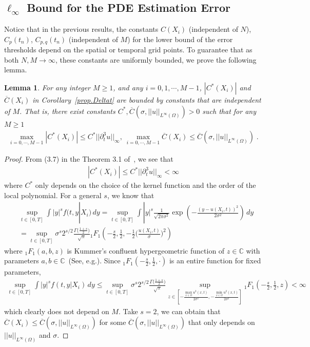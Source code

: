 \documentclass[a4paper,11pt]{article}
\newtheorem{lemma}{Lemma}[section]
\begin{document}
\subsection{$\ell_\infty$ Bound for the PDE Estimation Error}
Notice that in the previous results, the constants $C(X_i)$ (independent of $N$), $C_p(t_n)$, $C_{p,q}(t_n)$ (independent of $M$) for the lower bound of the error thresholds depend on the spatial or temporal grid points. To guarantee that as both $N,M\to\infty$, these constants are uniformly bounded, we prove the following lemma.
\begin{lemma}\label{lemma}
For any integer $M\geq 1$, and any $i=0,1,\cdots, M-1$,  $|C^*(X_i)|$ and $\overline{C}(X_i)$ in Corollary~\ref{prop.Deltat} are bounded by constants that are independent of $M$. That is, there exist constants $C^*, \overline{C}(\sigma,||u||_{L^\infty(\Omega)})>0$ such that for any $M\geq 1$
\begin{align}
\max_{i=0,\cdots, M-1}|C^*(X_i)|\leq C^*||\partial_t^3u||_\infty,~\max_{i=0,\cdots, M-1}\overline{C}(X_i)\leq \overline{C}(\sigma,||u||_{L^\infty(\Omega)})\;.
\end{align}
\end{lemma}
\begin{proof}
From (3.7) in the Theorem 3.1 of~\cite{fan1997local}, we see that
\begin{align*}
|C^*(X_i)|\leq C^*||\partial_t^3u||_\infty<\infty
\end{align*}
where $C^*$ only depends on the choice of the kernel function and the order of the local polynomial. For a general $s$, we know that
\begin{align*}
&\sup_{t\in [0,T]}\int |y|^sf(t,y|X_i)\,dy=\sup_{t\in [0,T]}\int |y|^s\frac{1}{\sqrt{2\pi\sigma^2}}\exp(-\frac{(y-u(X_i,t))^2}{2\sigma^2})\,dy\\
&=\sup_{t\in[0,T]}\sigma^s2^{s/2}\frac{\Gamma\big(\frac{1+s}{2}\big)}{\sqrt{\pi}}{_1F_1}(-\frac{s}{2},\frac{1}{2},-\frac{1}{2}\Big(\frac{u(X_i,t)}{\sigma}\Big)^2)
\end{align*} 
where ${_1F_1}(a,b,z)$ is Kummer's confluent hypergeometric function of $z\in\mathbb{C}$ with parameters $a,b\in\mathbb{C}$~(See, e.g.\cite{winkelbauer2012moments}). Since ${_1F_1}(-\frac{s}{2},\frac{1}{2},\cdot)$ is an entire function for fixed parameters,
\begin{align*}
\sup_{t\in [0,T]}\int |y|^sf(t,y|X_i)\,dy\leq 	\sup_{t\in[0,T]}\sigma^s2^{s/2}\frac{\Gamma\big(\frac{1+s}{2}\big)}{\sqrt{\pi}}\sup_{z\in [-\frac{\max_{x\in\Omega} u^2(x,t)}{2\sigma^2},-\frac{\min_{x\in\Omega} u^2(x,t)}{2\sigma^2}]}{_1F_1}(-\frac{s}{2},\frac{1}{2},z)<\infty
\end{align*}
which clearly does not depend on $M$. Take $s=2$, we can obtain that $\overline{C}(X_i)\leq \overline{C}(\sigma,||u||_{L^\infty(\Omega)})$ for some $\overline{C}(\sigma,||u||_{L^\infty(\Omega)})$ that only depends on $||u||_{L^\infty(\Omega)}$ and $\sigma$.
\end{proof}
\end{document}
